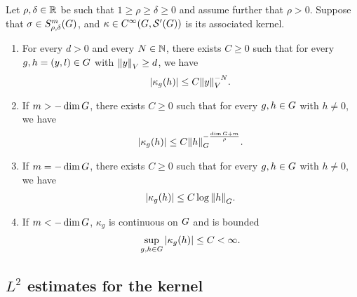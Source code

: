 \begin{theorem}
\label{theorem:kernel_estimates}
    Let $\rho, \delta \in \R$ be such that $1 \geq \rho \geq \delta \geq 0$
    and assume further that $\rho > 0$.
    Suppose that $\sigma \in \SymbolClass{m}{\rho, \delta}$,
    and $\kappa \in \SmoothFunctions {\Group, \TemperedDistributions \Group}$ is its associated kernel.
    \begin{enumerate}
        \item \label{item:kernel_estimates:at_infinity}
            For every $d > 0$ and every $N \in \N$,
            there exists $C \geq 0$ such that for every $g, h = (y, l) \in \Group$ with $\norm {y} \geq d$, we have
            \begin{align*}
                \abs{\kappa_g(h)} \leq C \norm y^{-N}.
            \end{align*}
        \item \label{item:kernel_estimates:at_origin:positive}
            If $m > - \dim \Group$, there exists $C \geq 0$ such that for every $g, h \in \Group$ with $h \neq 0$, we have
            \begin{align*}
                \abs{\kappa_g(h)} \leq C \norm [\Group] h^{- \frac{\dim \Group + m}{\rho}}.
            \end{align*}
        \item \label{item:kernel_estimates:at_origin:zero}
            If $m = -\dim \Group$, there exists $C \geq 0$ such that for every $g, h \in \Group$ with $h \neq 0$, we have
            \begin{align*}
                \abs{\kappa_g(h)} \leq C \log \norm [\Group] h.
            \end{align*}
        \item \label{item:kernel_estimates:at_origin:negative}
            If $m < -\dim \Group$, $\kappa_g$ is continuous on $\Group$ and is bounded
            \begin{align*}
                \sup_{g, h \in \Group} \abs{\kappa_g(h)} \leq C < \infty.
            \end{align*}
    \end{enumerate}
\end{theorem}

\subsection{\texorpdfstring{$L^2$}{L2} estimates for the kernel}

